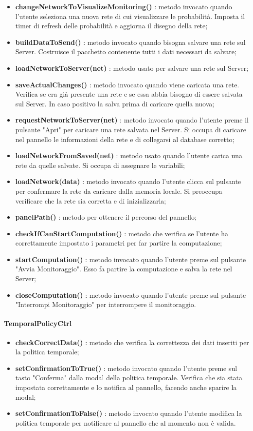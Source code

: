 \begin{itemize}
			\item \textbf{changeNetworkToVisualizeMonitoring()} : metodo invocato quando l'utente seleziona una nuova rete di cui visualizzare le probabilità. Imposta il timer di refresh delle probabilità e aggiorna il disegno della rete;
			\item \textbf{buildDataToSend()} : metodo invocato quando bisogna salvare una rete sul Server. Costruisce il pacchetto contenente tutti i dati necessari da salvare;
			\item \textbf{loadNetworkToServer(net)} : metodo usato per salvare una rete sul Server;
			\item \textbf{saveActualChanges()} : metodo invocato quando viene caricata una rete. Verifica se era già presente una rete e se essa abbia bisogno di essere salvata sul Server. In caso positivo la salva prima di caricare quella nuova;
			\item \textbf{requestNetworkToServer(net)} : metodo invocato quando l'utente preme il pulsante "Apri" per caricare una rete salvata nel Server. Si occupa di caricare nel pannello le informazioni della rete e di collegarsi al database corretto;
			\item \textbf{loadNetworkFromSaved(net)} : metodo usato quando l'utente carica una rete da quelle salvate. Si occupa di assegnare le variabili;
			\item \textbf{loadNetwork(data)} : metodo invocato quando l'utente clicca sul pulsante per confermare la rete da caricare dalla memoria locale. Si preoccupa verificare che la rete sia corretta e di inizializzarla;
			\item \textbf{panelPath()} : metodo per ottenere il percorso del pannello;
			\item \textbf{checkIfCanStartComputation()} : metodo che verifica se l'utente ha correttamente impostato i parametri per far partire la computazione;
			\item \textbf{startComputation()} : metodo invocato quando l'utente preme sul pulsante "Avvia Monitoraggio". Esso fa partire la computazione e salva la rete nel Server;
			\item \textbf{closeComputation()} : metodo invocato quando l'utente preme sul pulsante "Interrompi Monitoraggio" per interrompere il monitoraggio.
	\end{itemize}
	  \paragraph{TemporalPolicyCtrl} 
			\begin{itemize}
				\item	\textbf{checkCorrectData()} : metodo che verifica la correttezza dei dati inseriti per la politica temporale;
				\item \textbf{setConfirmationToTrue()} : metodo invocato quando l'utente preme sul tasto "Conferma" dalla modal della politica temporale. Verifica che sia stata impostata correttamente e lo notifica al pannello, facendo anche sparire la modal;
				\item \textbf{setConfirmationToFalse()} : metodo invocato quando l'utente modifica la politica temporale  per notificare al pannello che al momento non è valida.
	\end{itemize}
